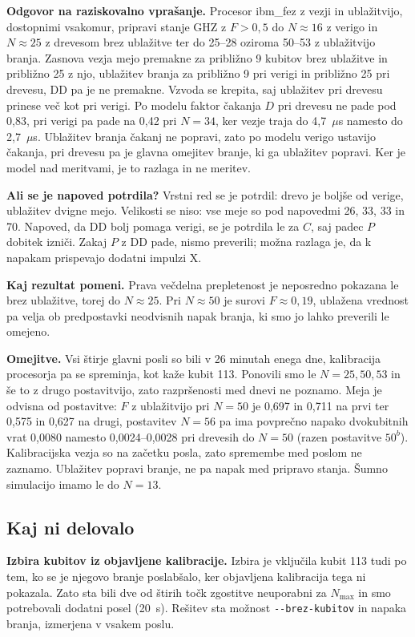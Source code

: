 \textbf{Odgovor na raziskovalno vprašanje.} Procesor ibm\_fez z vezji in ublažitvijo, dostopnimi vsakomur, pripravi stanje GHZ z $F>0{,}5$
do $N\approx16$ z verigo in $N\approx25$ z drevesom brez ublažitve ter do 25--28 oziroma 50--53 z ublažitvijo branja. Zasnova vezja mejo
premakne za približno 9 kubitov brez ublažitve in približno 25 z njo, ublažitev branja za približno 9 pri verigi in približno 25 pri
drevesu, DD pa je ne premakne. Vzvoda se krepita, saj ublažitev pri drevesu prinese več kot pri verigi. Po modelu faktor čakanja $D$ pri drevesu ne pade pod 0,83, pri verigi pa pade na
0,42 pri $N=34$, ker vezje traja do 4,7~$\mu$s namesto do 2,7~$\mu$s. Ublažitev branja čakanj ne popravi, zato po modelu verigo ustavijo čakanja, pri
drevesu pa je glavna omejitev branje, ki ga ublažitev popravi. Ker je model nad meritvami, je to razlaga in ne meritev.

\textbf{Ali se je napoved potrdila?} Vrstni red se je potrdil: drevo je boljše od verige, ublažitev dvigne mejo. Velikosti se niso: vse
meje so pod napovedmi 26, 33, 33 in 70. Napoved, da DD bolj pomaga verigi, se je potrdila le za $C$, saj padec $P$ dobitek izniči. Zakaj $P$
z DD pade, nismo preverili; možna razlaga je, da k napakam prispevajo dodatni impulzi X.

\textbf{Kaj rezultat pomeni.} Prava večdelna prepletenost je neposredno pokazana le brez ublažitve, torej do $N\approx25$. Pri $N\approx50$ je
surovi $F\approx0{,}19$, ublažena vrednost pa velja ob predpostavki neodvisnih napak branja, ki smo jo lahko preverili le omejeno.

\textbf{Omejitve.} Vsi štirje glavni posli so bili v 26 minutah enega dne, kalibracija procesorja pa se spreminja, kot kaže kubit 113. Ponovili smo le
$N=25, 50, 53$ in še to z drugo postavitvijo, zato razpršenosti med dnevi ne poznamo. Meja je odvisna od postavitve: $F$ z ublažitvijo pri $N=50$ je
0,697 in 0,711 na prvi ter 0,575 in 0,627 na drugi, postavitev $N=56$ pa ima povprečno napako dvokubitnih vrat 0,0080 namesto 0,0024--0,0028
pri drevesih do $N=50$ (razen postavitve $50^b$). Kalibracijska vezja so na začetku posla, zato spremembe med poslom ne zaznamo. Ublažitev popravi branje, ne pa napak
med pripravo stanja. Šumno simulacijo imamo le do $N=13$.

\subsection{Kaj ni delovalo}
\label{g20:sec:neuspehi}

\textbf{Izbira kubitov iz objavljene kalibracije.} Izbira je vključila kubit 113 tudi po tem, ko se je njegovo branje poslabšalo, ker
objavljena kalibracija tega ni pokazala. Zato sta bili dve od štirih točk zgostitve neuporabni za $N_{\max}$ in smo potrebovali dodatni
posel (20~s). Rešitev sta možnost \texttt{-{}-brez-kubitov} in napaka branja, izmerjena v vsakem poslu.

